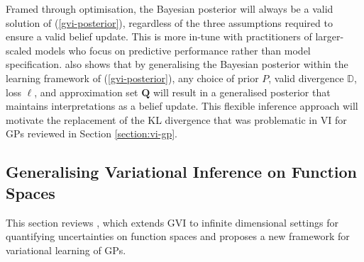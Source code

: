 \documentclass{article}
\numberwithin{equation}{section}
\begin{document}
Framed through optimisation, the Bayesian posterior will always be a valid solution of (\ref{gvi-posterior}), regardless of the three  assumptions required to ensure a valid belief update.
This is more in-tune with practitioners of larger-scaled models who focus on predictive performance rather than model specification.
\cite{knoblauch2022optimization} also shows that by generalising the Bayesian posterior within the learning framework of (\ref{gvi-posterior}), any choice of prior $P$, valid divergence $\mathbb{D}$, loss $\ell$, and approximation set $\boldsymbol{Q}$ will result in a generalised posterior that maintains interpretations as a belief update.
This flexible inference approach will motivate the replacement of the KL divergence that was problematic in VI for GPs reviewed in Section \ref{section:vi-gp}.

\subsection{Generalising Variational Inference on Function Spaces}
This section reviews \cite{wild2022generalized}, which extends GVI to infinite dimensional settings for quantifying uncertainties on function spaces and proposes  a new framework for variational learning of GPs.
\end{document}
